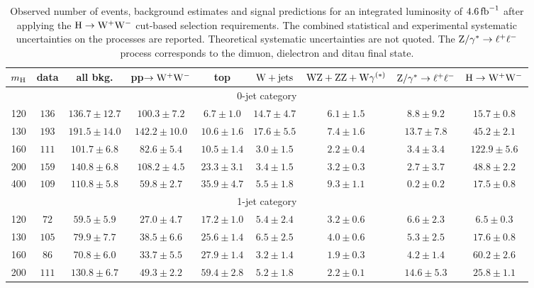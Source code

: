 \documentclass[11pt,twoside,a4paper,cmspaper,final,collab]{cms-tdr}
\begin{document}
\begin{table}[htbp]
  \begin{center}
  \caption{Observed number of events, background estimates and signal predictions
  for an integrated luminosity of $4.6\mbox{\ensuremath{\,\text{fb}^\text{$-$1}}}$ after applying the $\mathrm{H}\to\mathrm{W^+}{}\mathrm{W^-}$ cut-based selection requirements.
  The combined statistical and experimental systematic uncertainties on the processes are reported.
  Theoretical systematic uncertainties are not quoted.
  The $\mathrm{Z}/\gamma^*\to \ell^+\ell^-$ process corresponds to the dimuon, dielectron and ditau final state.}
   \label{tab:hwwselection}
 {
\setlength{\extrarowheight}{1pt}
\begin{tabular} {|c|c|c|c|c|c|c|c|c|}
  \hline
$m_{\mathrm{H}}$ & data & all bkg. & pp$\to \mathrm{W^+}{}\mathrm{W^-}$ & top & $\mathrm{W}+\mathrm{jets}$ & $\mathrm{W}\mathrm{Z}+\mathrm{Z}\mathrm{Z}+\mathrm{W}\gamma^{(*)}$ & $\mathrm{Z}/\gamma^*\to \ell^+\ell^-$ & $\mathrm{H} \to \mathrm{W^+}{}\mathrm{W^-}$ \\ \hline
\multicolumn{9}{|c|}{0-jet category} \\
  \hline
120 & $136$ & $136.7\pm12.7$ & $100.3\pm7.2$  & $6.7\pm1.0$  & $14.7\pm4.7$ & $6.1\pm1.5$ & $8.8\pm9.2$  & $15.7\pm0.8$  \\ \hline
130 & $193$ & $191.5\pm14.0$ & $142.2\pm10.0$ & $10.6\pm1.6$ & $17.6\pm5.5$ & $7.4\pm1.6$ & $13.7\pm7.8$ & $45.2\pm2.1$  \\ \hline
160 & $111$ & $101.7\pm6.8$  & $82.6\pm5.4$   & $10.5\pm1.4$ & $3.0\pm1.5$  & $2.2\pm0.4$ & $3.4\pm3.4$  & $122.9\pm5.6$ \\ \hline
200 & $159$ & $140.8\pm6.8$  & $108.2\pm4.5$  & $23.3\pm3.1$ & $3.4\pm1.5$  & $3.2\pm0.3$ & $2.7\pm3.7$  & $48.8\pm2.2$  \\ \hline
400 & $109$ & $110.8\pm5.8$  & $59.8\pm2.7$   & $35.9\pm4.7$ & $5.5\pm1.8$  & $9.3\pm1.1$ & $0.2\pm0.2$  & $17.5\pm0.8$  \\ \hline
\multicolumn{9}{|c|}{1-jet category} \\
\hline
120 & $72$  & $59.5\pm5.9$   & $27.0\pm4.7$   & $17.2\pm1.0$ & $5.4\pm2.4$  & $3.2\pm0.6$ & $6.6\pm2.3$  & $6.5\pm0.3$  \\ \hline
130 & $105$ & $79.9\pm7.7$   & $38.5\pm6.6$   & $25.6\pm1.4$ & $6.5\pm2.5$  & $4.0\pm0.6$ & $5.3\pm2.5$  & $17.6\pm0.8$ \\ \hline
160 & $86$  & $70.8\pm6.0$   & $33.7\pm5.5$   & $27.9\pm1.4$ & $3.2\pm1.4$  & $1.9\pm0.3$ & $4.2\pm1.4$  & $60.2\pm2.6$ \\ \hline
200 & $111$ & $130.8\pm6.7$  & $49.3\pm2.2$   & $59.4\pm2.8$ & $5.2\pm1.8$  & $2.2\pm0.1$ & $14.6\pm5.3$ & $25.8\pm1.1$ \\ \hline

\end{tabular}}
\end{center}
\end{table}
\end{document}
